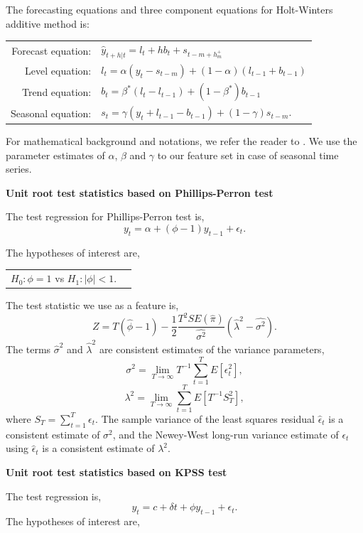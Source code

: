 \documentclass[11pt,a4paper,]{article}
\theoremstyle{definition}
\theoremstyle{definition}
\theoremstyle{definition}
\theoremstyle{remark}
\begin{document}
The forecasting equations and three component equations for Holt-Winters
additive method is:

\begin{table}[!h]
\centering
\begin{tabular}{rl}
Forecast equation: &  $\hat{y}_{t+h|t}=l_t + hb_t+s_{t-m+h_m^+}$ \\
 Level equation: & $l_t = \alpha (y_t-s_{t-m}) + (1-\alpha)(l_{t-1}+b_{t-1})$ \\
Trend equation: &  $b_t=\beta^*(l_t-l_{t-1})+(1-\beta^*)b_{t-1}$\\
Seasonal equation: &  $s_t=\gamma(y_t+l_{t-1}-b_{t-1})+(1-\gamma)s_{t-m}.$
\end{tabular}
\end{table}

For mathematical background and notations, we refer the reader to
\textcite{hyndman2014forecasting}. We use the parameter estimates of
\(\alpha\), \(\beta\) and \(\gamma\) to our feature set in case of
seasonal time series.

\textbf{Unit root test statistics based on Phillips-Perron test}

The test regression for Phillips-Perron test is,
\[ y_t=\alpha+(\phi -1)y_{t-1}+ \epsilon_t. \]

The hypotheses of interest are,

\begin{table}[!h]
\centering
\begin{tabular}{rl}
$H_0: \phi = 1$ vs
$H_1: |\phi| < 1$. 
\end{tabular}
\end{table}

The test statistic we use as a feature is,
\[Z = T(\hat{\phi}-1)-\frac{1}{2}\frac{T^2SE(\hat{\pi})}{\hat{\sigma^2}}(\hat{\lambda}^2-\hat{\sigma^2}).\]
The terms \(\hat{\sigma}^2\) and \(\hat{\lambda}^2\) are consistent
estimates of the variance parameters,
\[\sigma^2=\lim_{T\to\infty}T^{-1}\sum_{t=1}^{T}E[\epsilon_t^2],\]
\[\lambda^2=\lim_{T\to\infty}\sum_{t=1}^{T}E[T^{-1}S_T^2],\] where
\(S_T = \sum_{t=1}^{T}\epsilon_t\). The sample variance of the least
squares residual \(\hat{\epsilon}_t\) is a consistent estimate of
\(\sigma^2\), and the Newey-West long-run variance estimate of
\(\epsilon_t\) using \(\hat{\epsilon}_t\) is a consistent estimate of
\(\lambda^2\).

\textbf{Unit root test statistics based on KPSS test}

The test regression is, \[y_t=c+\delta t+\phi y_{t-1}+\epsilon_t.\] The
hypotheses of interest are,
\end{document}
